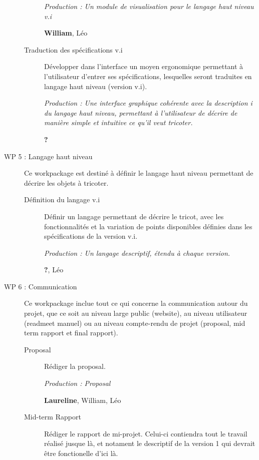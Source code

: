 \documentclass{article}
\begin{document}
\begin{description}
\begin{description}
    \textit{Production : Un module de visualisation pour le langage haut niveau v.i}

    \textbf{William}, Léo %

  \item[Traduction des spécifications v.i] Développer dans l'interface un moyen ergonomique permettant à l'utilisateur d'entrer ses spécifications, lesquelles seront traduites en langage haut niveau (version v.i).

    \textit{Production : Une interface graphique cohérente avec la description i du langage haut niveau, permettant à l'utilisateur de décrire de manière simple et intuitive ce qu'il veut tricoter.}

    \textbf{?}
  \end{description}

\medskip

\item[WP 5 : Langage haut niveau] Ce workpackage est destiné à définir le langage haut niveau permettant de décrire les objets à tricoter.

  \begin{description}
  \item[Définition du langage v.i] Définir un langage permettant de décrire le tricot, avec les fonctionnalités et la variation de points disponibles définies dans les spécifications de la version v.i.

    \textit{Production : Un langage descriptif, étendu à chaque version.}

    \textbf{?}, Léo
  \end{description}

\medskip

\item[WP 6 : Communication] Ce workpackage inclue tout ce qui concerne la communication autour du projet, que ce soit au niveau large public (website), au niveau utilisateur (readmeet manuel) ou au niveau compte-rendu de projet (proposal, mid term rapport et final rapport).

  \begin{description}
  \item[Proposal] Rédiger la proposal.

    \textit{Production : Proposal}

    \textbf{Laureline}, William, Léo

  \item[Mid-term Rapport] Rédiger le rapport de mi-projet. Celui-ci contiendra tout le travail réalisé jusque là, et notament le descriptif de la version 1 qui devrait être fonctionelle d'ici là.


\end{description}
\end{description}
\end{document}
